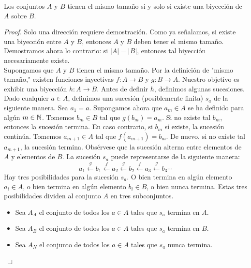 \message{ !name(main.tex)}\documentclass[12pt,a4paper]{book}
\newcommand{\comillas}[1]{"#1"}
\begin{document}
    \begin{teorema}\label{thm:cantor-bernstein}
        Los conjuntos $A$ y $B$ tienen el mismo tamaño si y solo si existe una biyección de $A$ sobre $B$.
    \end{teorema}
    \begin{proof}
        Solo una dirección requiere demostración. Como ya señalamos, si existe una biyección entre $A$ y $B$, entonces $A$
        y $B$ deben tener el mismo tamaño. Demostramos ahora lo contrario: si $|A|=|B|$, entonces tal biyección
        necesariamente existe.\\
        Supongamos que $A$ y $B$ tienen el mismo tamaño. Por la definición de \comillas{mismo tamaño,} existen funciones
        inyectivas $f:A\rightarrow B$ y $g:B\rightarrow A$. Nuestro objetivo es exhibir una biyección $h:A\rightarrow B$.
        Antes de definir $h$, definimos algunas sucesiones.\\
        Dado cualquier $a\in A$, definimos una sucesión (posiblemente finita) $s_{a}$ de la siguiente manera. Sea $a_{1}=a$.
        Supongamos ahora que $a_{m}\in A$ se ha definido para algún $m\in\mathbb{N}$. Tomemos $b_{m}\in B$ tal que $g(b_{m})=a_{m}$.
        Si no existe tal $b_{m}$, entonces la sucesión termina. En caso contrario, si $b_{m}$ sí existe, la sucesión
        continúa. Tomemos $a_{m+1}\in A$ tal que $f(a_{m+1})=b_{m}$. De nuevo, si no existe tal $a_{m+1}$, la sucesión
        termina. Obsérvese que la sucesión alterna entre elementos de $A$ y elementos de $B$. La sucesión $s_{a}$ puede
        representarse de la siguiente manera:
        \begin{equation*}
            a_{1}\xleftarrow{g}b_{1}\xleftarrow{f}a_{2}\xleftarrow{g}b_{2}\xleftarrow{f}a_{3}\xleftarrow{g}b_{3}\cdots
        \end{equation*}
        Hay tres posibilidades para la sucesión $s_{a}$. O bien termina en algún elemento $a_{i}\in A$, o bien termina en
        algún elemento $b_{i}\in B$, o bien nunca termina. Estas tres posibilidades dividen al conjunto $A$ en tres
        subconjuntos.

        \begin{itemize}
            \item[$\bullet$] Sea $A_{A}$ el conjunto de todos los $a\in A$ tales que $s_{a}$ termina en $A$.
            \item[$\bullet$] Sea $A_{B}$ el conjunto de todos los $a\in A$ tales que $s_{a}$ termina en $B$.
            \item[$\bullet$] Sea $A_{N}$ el conjunto de todos los $a\in A$ tales que $s_{a}$ nunca termina.
        \end{itemize}


\end{proof}
\end{document}
